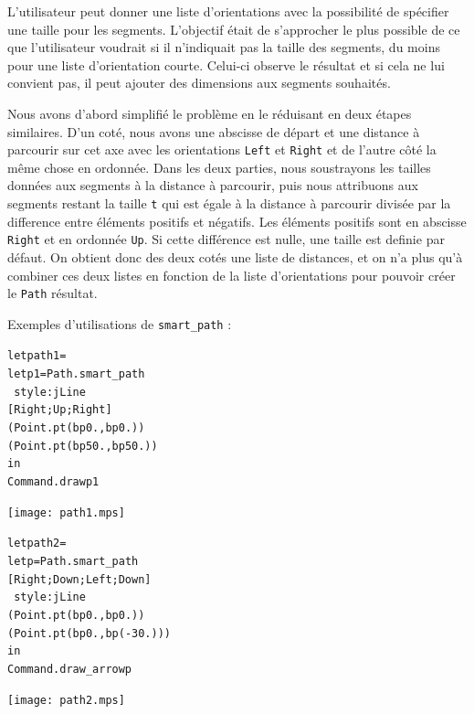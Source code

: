 \documentclass[a4paper,12pt]{article}
\begin{document}
L'utilisateur peut donner une liste d'orientations avec la possibilité de spécifier une taille pour les segments.
L'objectif était de s'approcher le plus possible de ce que l'utilisateur voudrait si il n'indiquait pas la taille des segments, du moins pour une liste d'orientation courte. 
Celui-ci observe le résultat et si cela ne lui convient pas, il peut ajouter des dimensions aux segments souhaités.
\bigskip

Nous avons d'abord simplifié le problème en le réduisant en deux étapes similaires.
D'un coté, nous avons une abscisse de départ et une distance à parcourir sur cet axe avec les orientations \texttt{Left} et \texttt{Right} et de l'autre côté la même chose en ordonnée.
Dans les deux parties, nous soustrayons les tailles données aux segments à la distance à parcourir, puis nous attribuons aux segments restant la taille \texttt{t} qui est égale à la distance à parcourir divisée par la difference entre éléments positifs et négatifs.
Les éléments positifs sont en abscisse \texttt{Right} et en ordonnée \texttt{Up}. Si cette différence est nulle, une taille est definie par défaut. 
On obtient donc des deux cotés une liste de distances, et on n'a plus qu'à combiner ces deux listes en fonction de la liste d'orientations pour pouvoir créer le \texttt{Path} résultat.


\bigskip 

Exemples d'utilisations de \texttt{smart\_path} :
\bigskip

\begin{minipage}{0.5\linewidth}
  \begin{alltt}
    let path1 = 
    let p1 = Path.smart_path 
    ~style:jLine
    [Right;Up;Right]
    (Point.pt (bp 0.,bp 0.)) 
    (Point.pt (bp 50.,bp 50.))
    in
    Command.draw p1
  \end{alltt}
\end{minipage}
\begin{minipage}{0.5\linewidth}
\begin{center}
\texttt{[image: path1.mps]}
\end{center}
\end{minipage}

\bigskip
\begin{minipage}{0.5\linewidth}
  \begin{alltt}
    let path2 = 
    let p = Path.smart_path 
    [Right;Down;Left;Down]
    ~style:jLine
    (Point.pt (bp 0.,bp 0.)) 
    (Point.pt (bp 0.,bp (-30.)))
    in
    Command.draw_arrow p
  \end{alltt}
\end{minipage}
\begin{minipage}{0.5\linewidth}
\begin{center}
\texttt{[image: path2.mps]}
\end{center}
\end{minipage}
\end{document}
